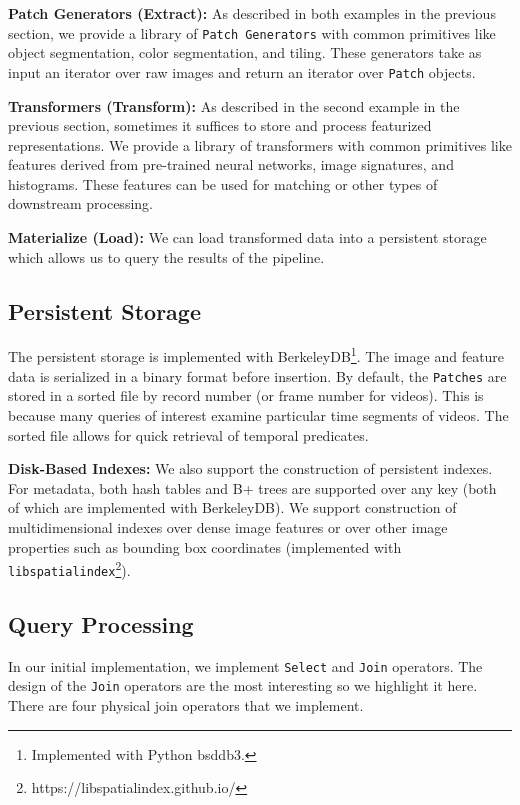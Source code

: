 \vspace{0.25em}
\noindent \textbf{Patch Generators (Extract): } As described in both examples in the previous section, we provide a library of \texttt{Patch Generators} with common primitives like object segmentation, color segmentation, and tiling. These generators take as input an iterator over raw images and return an iterator over \texttt{Patch} objects.

\vspace{0.25em}
\noindent \textbf{Transformers (Transform): } As described in the second example in the previous section, sometimes it suffices to store and process featurized representations. We provide a library of transformers with common primitives like features derived from pre-trained neural networks, image signatures, and histograms. These features can be used for matching or other types of downstream processing.

\vspace{0.25em}
\noindent \textbf{Materialize (Load): } We can load transformed data into a persistent storage which allows us to query the results of the pipeline.

\subsection{Persistent Storage}
The persistent storage is implemented with BerkeleyDB\footnote{Implemented with Python bsddb3.}. The image and feature data is serialized in a binary format before insertion. By default, the \texttt{Patches} are stored in a sorted file by record number (or frame number for videos). This is because many queries of interest examine particular time segments of videos.
The sorted file allows for quick retrieval of temporal predicates.

\vspace{0.25em}
\noindent \textbf{Disk-Based Indexes: } We also support the construction of persistent indexes. For metadata, both hash tables and B+ trees are supported over any key (both of which are implemented with BerkeleyDB). We support construction of multidimensional indexes over dense image features or over other image properties such as bounding box coordinates (implemented with \texttt{libspatialindex}\footnote{https://libspatialindex.github.io/}).

\subsection{Query Processing}
In our initial implementation, we implement \texttt{Select} and \texttt{Join} operators. The design of the \texttt{Join} operators are the most interesting so we highlight it here. There are four physical join operators that we implement.   

